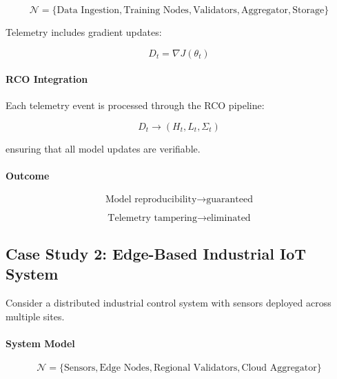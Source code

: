 \begin{equation}
\mathcal{N} = \{\text{Data Ingestion}, \text{Training Nodes}, \text{Validators}, \text{Aggregator}, \text{Storage}\}
\end{equation}

Telemetry includes gradient updates:

\begin{equation}
D_t = \nabla J(\theta_t)
\end{equation}

\paragraph{RCO Integration}

Each telemetry event is processed through the RCO pipeline:

\begin{equation}
D_t \rightarrow (H_t, L_t, \Sigma_t)
\end{equation}

ensuring that all model updates are verifiable.

\paragraph{Outcome}

\begin{equation}
\text{Model reproducibility} \rightarrow \text{guaranteed}
\end{equation}

\begin{equation}
\text{Telemetry tampering} \rightarrow \text{eliminated}
\end{equation}

\subsection{Case Study 2: Edge-Based Industrial IoT System}

Consider a distributed industrial control system with sensors deployed across multiple sites.

\paragraph{System Model}

\begin{equation}
\mathcal{N} = \{\text{Sensors}, \text{Edge Nodes}, \text{Regional Validators}, \text{Cloud Aggregator}\}
\end{equation}

